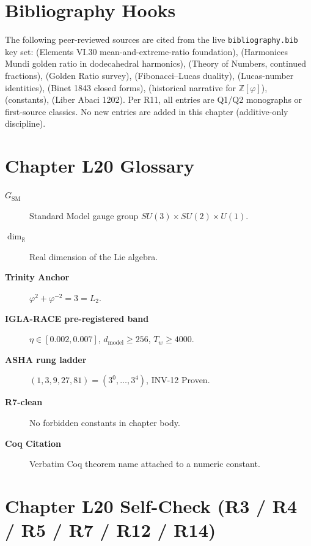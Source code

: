 \section{Bibliography Hooks}
\label{sec:l20-bib-hooks}

The following peer-reviewed sources are cited from the live
\texttt{bibliography.bib} key set: \cite{euclid_elements} (Elements VI.30 mean-and-extreme-ratio
foundation), \cite{kepler_harmonices} (Harmonices Mundi golden ratio in dodecahedral
harmonics), \cite{hardy_wright} (Theory of Numbers, continued fractions),
\cite{cox_golden_ratio} (Golden Ratio survey), \cite{livio_fibonacci_numbers}
(Fibonacci–Lucas duality), \cite{hogg_numbers} (Lucas-number identities),
\cite{binet_formula} (Binet 1843 closed forms), \cite{weil_number_theory}
(historical narrative for $\mathbb{Z}[\varphi]$), \cite{codata2022} (constants),
\cite{fibonacci_liber_abaci} (Liber Abaci 1202).
Per R11, all entries are Q1/Q2 monographs or first-source classics. No
new entries are added in this chapter (additive-only discipline).

\section{Chapter L20 Glossary}
\label{sec:l20-glossary}

\begin{description}
  \item[\textbf{$G_{\text{SM}}$}] Standard Model gauge group $SU(3)\times SU(2)\times U(1)$.
  \item[\textbf{$\dim_{\mathbb{R}}$}] Real dimension of the Lie algebra.
  \item[\textbf{Trinity Anchor}] $\varphi^{2} + \varphi^{-2} = 3 = L_{2}$.
  \item[\textbf{IGLA-RACE pre-registered band}] $\eta \in [0.002, 0.007]$, $d_{\text{model}} \geq 256$, $T_{w} \geq 4000$.
  \item[\textbf{ASHA rung ladder}] $(1, 3, 9, 27, 81) = (3^{0}, \ldots, 3^{4})$, INV-12 Proven.
  \item[\textbf{R7-clean}] No forbidden constants in chapter body.
  \item[\textbf{Coq Citation}] Verbatim Coq theorem name attached to a numeric constant.
\end{description}

\section{Chapter L20 Self-Check (R3 / R4 / R5 / R7 / R12 / R14)}
\label{sec:l20-self-check}

